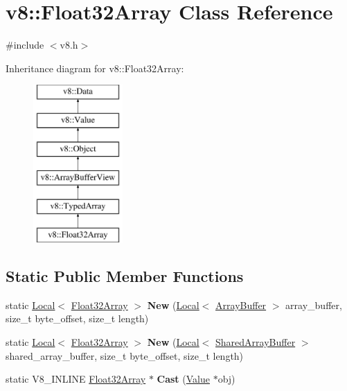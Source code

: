 \hypertarget{classv8_1_1Float32Array}{}\section{v8\+:\+:Float32\+Array Class Reference}
\label{classv8_1_1Float32Array}


{\ttfamily \#include $<$v8.\+h$>$}

Inheritance diagram for v8\+:\+:Float32\+Array\+:\begin{figure}[H]
\begin{center}
\leavevmode
\includegraphics[height=6.000000cm]{classv8_1_1Float32Array}
\end{center}
\end{figure}
\subsection*{Static Public Member Functions}
\begin{DoxyCompactItemize}
\item 
\mbox{\label{classv8_1_1Float32Array_af7e2ce97268849289d8ab38fd07fbf62}} 
static \mbox{\hyperlink{classv8_1_1Local}{Local}}$<$ \mbox{\hyperlink{classv8_1_1Float32Array}{Float32\+Array}} $>$ {\bfseries New} (\mbox{\hyperlink{classv8_1_1Local}{Local}}$<$ \mbox{\hyperlink{classv8_1_1ArrayBuffer}{Array\+Buffer}} $>$ array\+\_\+buffer, size\+\_\+t byte\+\_\+offset, size\+\_\+t length)
\item 
\mbox{\label{classv8_1_1Float32Array_af3140edf1f13845670f4e4ddd41200c3}} 
static \mbox{\hyperlink{classv8_1_1Local}{Local}}$<$ \mbox{\hyperlink{classv8_1_1Float32Array}{Float32\+Array}} $>$ {\bfseries New} (\mbox{\hyperlink{classv8_1_1Local}{Local}}$<$ \mbox{\hyperlink{classv8_1_1SharedArrayBuffer}{Shared\+Array\+Buffer}} $>$ shared\+\_\+array\+\_\+buffer, size\+\_\+t byte\+\_\+offset, size\+\_\+t length)
\item 
\mbox{\label{classv8_1_1Float32Array_adf926d03cacd4b3901d7f9750671a350}} 
static V8\+\_\+\+I\+N\+L\+I\+NE \mbox{\hyperlink{classv8_1_1Float32Array}{Float32\+Array}} $\ast$ {\bfseries Cast} (\mbox{\hyperlink{classv8_1_1Value}{Value}} $\ast$obj)
\end{DoxyCompactItemize}
